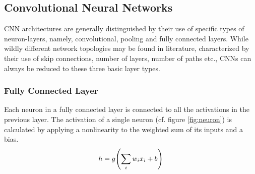 \subsection{Convolutional Neural Networks}
CNN architectures are generally distinguished by their use of specific types of neuron-layers, namely, convolutional, pooling and fully connected layers. While wildly different network topologies may be found in literature, characterized by their use of skip connections, number of layers, number of paths etc., CNNs can always be reduced to these three basic layer types.
\subsubsection{Fully Connected Layer}
Each neuron in a fully connected layer is connected to all the activations in the previous layer. The activation of a single neuron (cf. figure \ref{fig:neuron}) is calculated by applying a nonlinearity to the weighted sum of its inputs and a bias.
\begin{align}
    h = g\qty(\sum_i w_i x_i +b)
    \label{eq:neuron}
\end{align}
